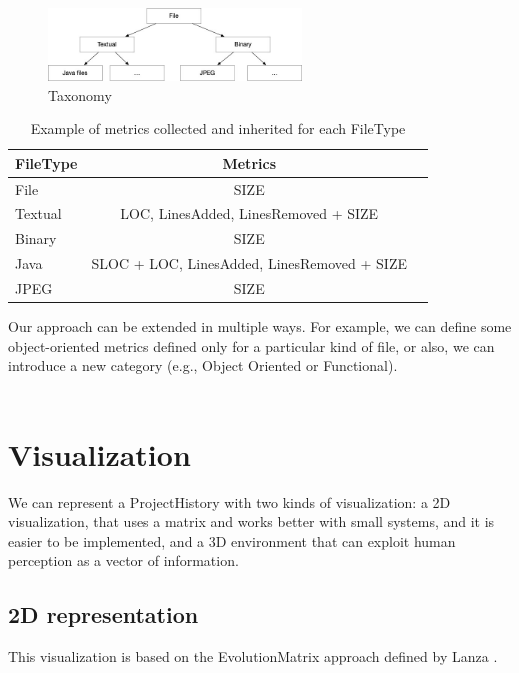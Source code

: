 \begin{figure}
    \center
    \includegraphics[width=0.6\textwidth]{Taxonomy.jpg}
    \caption{Taxonomy}
    \label{fig:taxonomy}
\end{figure}

\begin{table}[ht]
    \centering
    \begin{tabular}{lcr} \hline
    {\bf FileType} & {\bf Metrics}\\ \hline
    File    & SIZE      \\
    Textual & LOC, LinesAdded, LinesRemoved + SIZE \\
    Binary  & SIZE         \\
    Java    & SLOC + LOC, LinesAdded, LinesRemoved + SIZE \\
    JPEG    & SIZE \\
    \end{tabular}
    \label{tab:taxonomyApproach}
    \caption[]{Example of metrics collected and inherited for each FileType}
\end{table}

Our approach can be extended in multiple ways. 
For example, we can define some object-oriented metrics defined only for a particular kind of file, or also, we can introduce a new category (e.g., Object Oriented or Functional). \\
\\

\section{Visualization}
We can represent a ProjectHistory with two kinds of visualization: a 2D visualization,
 that uses a matrix and works better with small systems, and it is easier to be implemented,
  and a 3D environment that can exploit human perception as a vector of information. 


\subsection*{2D representation}
This visualization is based on the EvolutionMatrix approach defined by Lanza \cite{Lanza2001}. 

